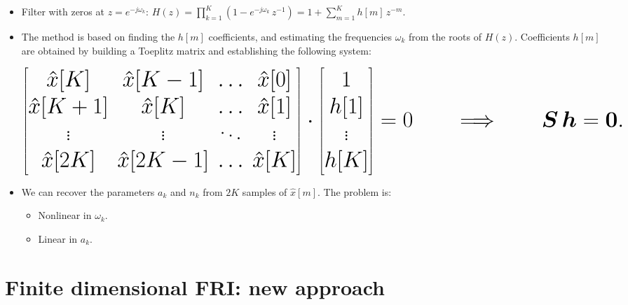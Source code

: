 \documentclass[a0,portrait]{a0poster}
\begin{document}
\begin{multicols}{2}
\begin{itemize}
\item Filter with zeros at $z=e^{-j \omega_k}$: 
$H(z) = \prod_{k=1}^{K} \left(1-e^{-j \omega_k} \, z^{-1}\right) = 1 + \sum_{m=1}^{K} h[m] \, z^{-m}$.

\item The method is based on finding the $h[m]$ coefficients, and estimating the frequencies
$\omega_k$ from the roots of $H(z)$. Coefficients $h[m]$ are obtained by building a Toeplitz matrix
and establishing the following system:

\begin{equation*}
\normalsize
\begin{bmatrix}
\hat{x}[K] & \hat{x}[K-1] & \ldots & \hat{x}[0]\\
\hat{x}[K+1] & \hat{x}[K] & \ldots & \hat{x}[1]\\
\vdots & \vdots & \ddots & \vdots\\
\hat{x}[2K] & \hat{x}[2K-1] & \ldots & \hat{x}[K]\\
\end{bmatrix}
\cdot
\begin{bmatrix}
1\\ h[1]\\ \vdots\\ h[K]
\end{bmatrix}
= 0
\qquad \Longrightarrow \qquad
\bm{S}\,\bm{h} = \bm{0}.
\end{equation*}

\item We can recover the parameters $a_k$ and $n_k$ from $2K$ samples of $\hat{x}[m]$. The problem is:

\begin{itemize}
\item Nonlinear in $\omega_k.$
\item Linear in $a_k$.
\end{itemize}

\end{itemize}




\section*{Finite dimensional FRI: new approach}

\begin{itemize}


\end{itemize}
\end{multicols}
\end{document}
